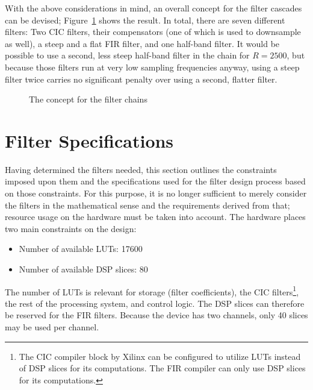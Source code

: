 With  the above  considerations in  mind, an  overall concept  for the  filter
cascades  can  be  devised; Figure~\ref{fig:fdesign:chain_concept}  shows  the
result. In total,  there are seven  different filters: Two CIC  filters, their
compensators (one of which is used to  downsample as well), a steep and a flat
FIR filter,  and one half-band filter. It  would be possible to  use a second,
less  steep half-band  filter in  the chain  for $R=2500$,  but because  those
filters run  at very  low sampling  frequencies anyway,  using a  steep filter
twice carries no significant penalty over using a second, flatter filter.

\begin{figure}
    \centering
    
    \caption[Filter Chain Concept]{The concept for the filter chains}
    \label{fig:fdesign:chain_concept}
\end{figure}

%
%
\section{Filter Specifications} %
\label{sec:fdesign:filter_specifications}

Having determined  the filters needed,  this section outlines  the constraints
imposed upon  them and the specifications  used for the  filter design process
based on those  constraints.  For this purpose, it is  no longer sufficient to
merely consider  the filters  in the mathematical  sense and  the requirements
derived from that; resource usage on  the hardware must be taken into account.
The hardware places two main constraints on the design:
\begin{itemize}\tightlist
    \item
        Number of available LUTs: \num{17600}
    \item
        Number of available DSP slices: \num{80}
\end{itemize}
The number  of LUTs  is relevant  for storage  (filter coefficients),  the CIC
filters\footnote{%
    The CIC compiler block by Xilinx can be configured to utilize LUTs instead
    of DSP  slices for  its computations. The  FIR compiler  can only  use DSP
    slices for its computations.%
},
the  rest of  the processing  system, and  control logic. The  DSP slices  can
therefore  be  reserved  for  the  FIR filters. Because  the  device  has  two
channels, only 40 slices may be used per channel.

